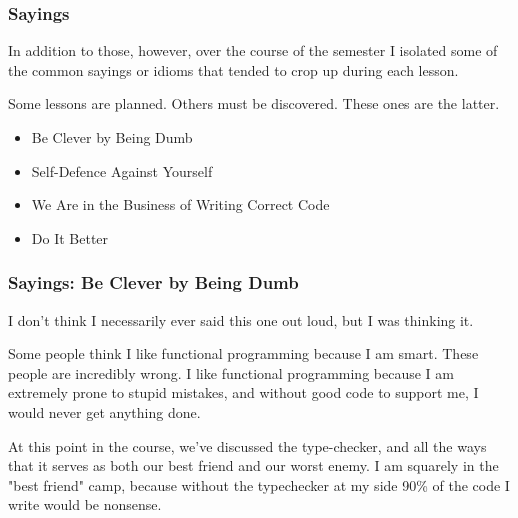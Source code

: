 \documentclass[aspectratio=169, handout]{beamer}
\begin{document}
\begin{frame}[fragile]
  \frametitle{Sayings}

  In addition to those, however, over the course of the semester I isolated
  some of the common sayings or idioms that tended to crop up during
  each lesson.

  \pause
  \vspace{\fill}

  Some lessons are planned. Others must be discovered. These ones are the
  latter.

  \pause
  \vspace{\fill}

  \begin{itemize}
    \item Be Clever by Being Dumb \pause
    \item Self-Defence Against Yourself \pause
    \item We Are in the Business of Writing Correct Code \pause
    \item Do It Better
  \end{itemize}
\end{frame}

\begin{frame}[fragile]
  \frametitle{Sayings: Be Clever by Being Dumb}

  I don't think I necessarily ever said this one out loud, but I was
  thinking it.

  \pause
  \vspace{\fill}

  Some people think I like functional programming because I am smart. These
  people are incredibly wrong. I like functional programming because I am
  extremely prone to stupid mistakes, and without good code to support me,
  I would never get anything done.

  \pause
  \vspace{\fill}

  At this point in the course, we've discussed the type-checker, and all
  the ways that it serves as both our best friend and our worst enemy. I
  am squarely in the "best friend" camp, because without the typechecker
  at my side 90\% of the code I write would be nonsense.
\end{frame}
\end{document}
